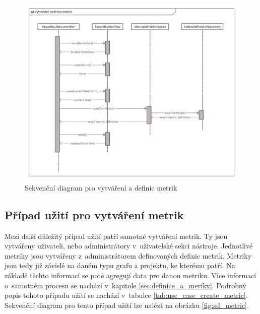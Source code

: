 \documentclass[czech,master]{diploma}
\begin{document}
\begin{figure}[!ht]
    \centering
    \includegraphics[width=1\textwidth]{Diplomka/Figures/sd_metric_definition.png}
    \caption{Sekvenční diagram pro vytváření a definic metrik}
    \label{fig:sd_metric_definition}
\end{figure}

\newpage

\subsection{Případ užití pro vytváření metrik}
Mezi další důležitý případ užití patří samotné vytváření metrik. Ty jsou vytvářeny uživateli, nebo administrátory v~uživatelské sekci nástroje. Jednotlivé metriky jsou vytvářeny z~administrátorem definovaných definic metrik. Metriky jsou tedy již závislé na daném typu grafu a projektu, ke kterému patří. Na základě těchto informací se poté agregují data pro danou metriku. Více informací o~samotném procesu se nachází v~kapitole \ref{sec:definice_a_meriky}. Podrobný popis tohoto případu užití se nachází v~tabulce \ref{tab:use_case_create_metric}. Sekvenční diagram pro tento případ užití lze nalézt na obrázku \ref{fig:sd_metric}.
\end{document}

